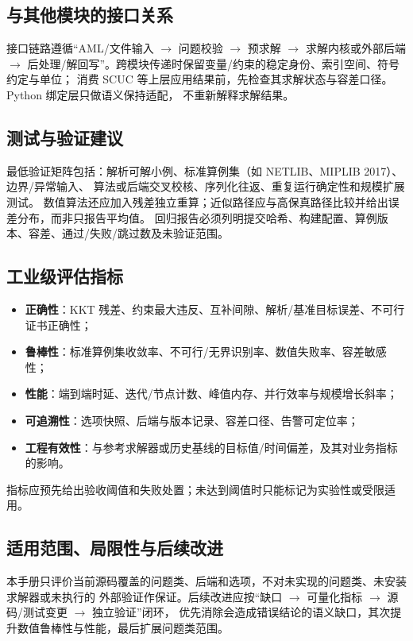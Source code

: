 \subsection{与其他模块的接口关系}
接口链路遵循``AML/文件输入 $\to$ 问题校验 $\to$ 预求解 $\to$ 求解内核或外部后端
$\to$ 后处理/解回写''。跨模块传递时保留变量/约束的稳定身份、索引空间、符号约定与单位；
消费 SCUC 等上层应用结果前，先检查其求解状态与容差口径。Python 绑定层只做语义保持适配，
不重新解释求解结果。

\subsection{测试与验证建议}
最低验证矩阵包括：解析可解小例、标准算例集（如 NETLIB、MIPLIB 2017）、边界/异常输入、
算法或后端交叉校核、序列化往返、重复运行确定性和规模扩展测试。
数值算法还应加入残差独立重算；近似路径应与高保真路径比较并给出误差分布，而非只报告平均值。
回归报告必须列明提交哈希、构建配置、算例版本、容差、通过/失败/跳过数及未验证范围。

\subsection{工业级评估指标}
\begin{itemize}
  \item \textbf{正确性}：KKT 残差、约束最大违反、互补间隙、解析/基准目标误差、不可行证书正确性；
  \item \textbf{鲁棒性}：标准算例集收敛率、不可行/无界识别率、数值失败率、容差敏感性；
  \item \textbf{性能}：端到端时延、迭代/节点计数、峰值内存、并行效率与规模增长斜率；
  \item \textbf{可追溯性}：选项快照、后端与版本记录、容差口径、告警可定位率；
  \item \textbf{工程有效性}：与参考求解器或历史基线的目标值/时间偏差，及其对业务指标的影响。
\end{itemize}
指标应预先给出验收阈值和失败处置；未达到阈值时只能标记为实验性或受限适用。

\subsection{适用范围、局限性与后续改进}
本手册只评价当前源码覆盖的问题类、后端和选项，不对未实现的问题类、未安装求解器或未执行的
外部验证作保证。后续改进应按``缺口 $\to$ 可量化指标 $\to$ 源码/测试变更 $\to$ 独立验证''闭环，
优先消除会造成错误结论的语义缺口，其次提升数值鲁棒性与性能，最后扩展问题类范围。
